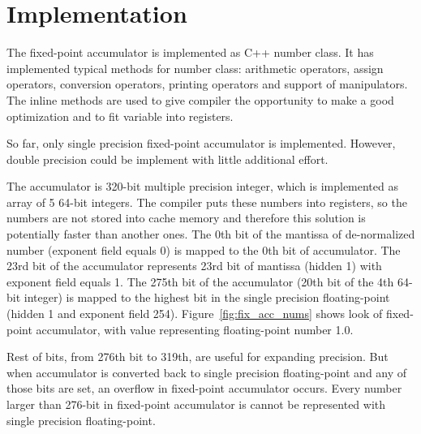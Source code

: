 \documentclass[conference]{IEEEtran}
\begin{document}
\section{Implementation}
The fixed-point accumulator is implemented as C++ number class.
It has implemented typical methods for number class: 
arithmetic operators, assign operators, conversion operators, printing operators and support of manipulators.
The inline methods are used to give compiler the opportunity to make a good optimization and to fit variable into registers.
\par
So far, only single precision fixed-point accumulator is implemented. 
However, double precision could be implement with little additional effort.
\par
The accumulator is 320-bit multiple precision integer, which is implemented as array of 5 64-bit integers.
The compiler puts these numbers into registers, 
so the numbers are not stored into cache memory 
and therefore this solution is potentially faster than another ones.
The 0th bit of the mantissa of de-normalized number (exponent field equals 0) is mapped to the 0th bit of accumulator.
The 23rd bit of the accumulator represents 23rd bit of mantissa (hidden 1) with exponent field equals 1.
The 275th bit of the accumulator (20th bit of the 4th 64-bit integer) 
is mapped to the highest bit in the single precision floating-point (hidden 1 and exponent field 254).
Figure~\ref{fig:fix_acc_nums} shows look of fixed-point accumulator, with value representing floating-point number 1.0.
\par
Rest of bits, from 276th bit to 319th, are useful for expanding precision.
But when accumulator is converted back to single precision floating-point and any of those bits are set,
an overflow in fixed-point accumulator occurs.
Every number larger than 276-bit in fixed-point accumulator is cannot be represented with single precision floating-point.
\end{document}
